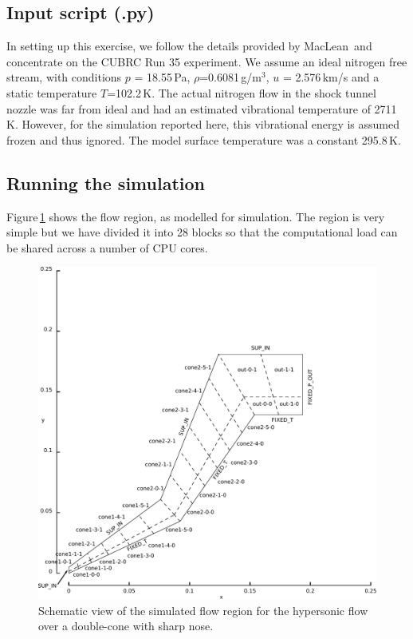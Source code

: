 \bigskip
\subsection{Input script (.py)}
%
In setting up this exercise, we follow the details provided by MacLean\,\cite{maclean_holden_2004a}
and concentrate on the CUBRC Run 35 experiment.
We assume an ideal nitrogen free stream, with conditions 
$p$ = 18.55\,Pa, $\rho$=0.6081\,g/m$^3$, $u$ = 2.576\,km/s and a static temperature $T$=102.2\,K.
The actual nitrogen flow in the shock tunnel nozzle was far from ideal and had an estimated
vibrational temperature of 2711\,K.
However, for the simulation reported here, this vibrational energy is assumed frozen and thus ignored.
The model surface temperature was a constant 295.8\,K.

\noindent
\topbar

\bottombar


\bigskip
\subsection{Running the simulation}
%
Figure\,\ref{fig:double-cone-sharp-nose-geometry} shows the flow region, as modelled for simulation.
The region is very simple but we have divided it into 28 blocks so that the computational load 
can be shared across a number of CPU cores.

\begin{figure}[htbp]
 \centering
 \includegraphics[width=\textwidth,viewport=0 0 430 419,clip=true]{../2D/double-cone-sharp-nose/dbl-cone-edited.pdf}
 \caption{Schematic view of the simulated flow region for the hypersonic flow
          over a double-cone with sharp nose.}
 \label{fig:double-cone-sharp-nose-geometry}
\end{figure}


